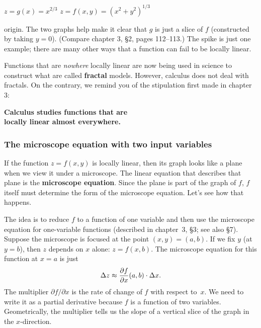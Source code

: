 {{{{ 
\vspace{165pt}

\noindent
{\small
\hspace{48pt}
$z = g(x) = x^{2/3}$
\hspace{90pt}
$z = f(x, y) = (x^2 + y^2)^{1/3}$
}

\noindent
origin.  The two graphs help make it clear that $g$ is just a slice of $f$ (constructed by taking $y = 0$).  (Compare chapter 3, \S 2, pages 112--113.)  The spike is just one example; there are many other ways that a function can fail to be locally linear.

	Functions that are
{\em nowhere\/} locally linear are now being used in science to construct what are called {\bf fractal} models.  However, calculus does not deal with fractals.  On the contrary, we remind you of the stipulation first made in chapter 3:
\begin{observation}

{\bf Calculus studies functions that are} \\

{\bf locally linear almost everywhere.}
\end{observation}

\subsubsection{The microscope equation with two input variables}

	If the function $z = f(x, y)$ is locally linear, 
then its graph looks like a plane when we view it under a microscope.  The linear equation that describes that plane is the {\bf microscope equation}.  Since the plane is part of the graph of $f$, $f$ itself must determine the form of the microscope equation.  Let's see how that happens.

	The idea is to reduce $f$ to a function of one variable and then use the microscope equation for one-variable functions (described in chapter~3, \S 3; see also \S 7).  Suppose the microscope is focused at the point $(x, y) = (a, b)$.  If we fix $y$ (at $y = b$), then $z$ depends on $x$ alone: $z = f(x, b)$.  The microscope equation 
for this function at $x = a$ is just
	\[
\Delta z \approx {\partial f \over \partial x}(a, b) \cdot \Delta x.
\]
The multiplier $\partial f/\partial x$ is the rate of change of $f$ with respect to~$x$.  We need to write it as a partial derivative because $f$ is a function of two variables.  Geometrically, the multiplier tells us the slope of a vertical slice of the graph in the $x$-direction.  

}}}}
